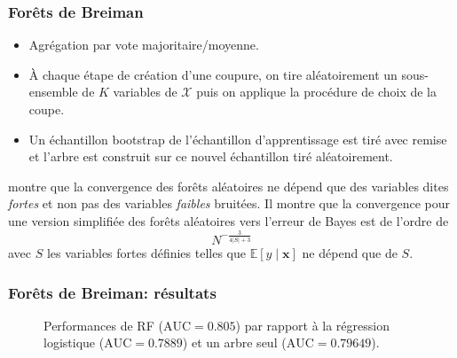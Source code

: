 \documentclass[dvipsnames,10pt]{beamer}
\theoremstyle{plain}
\theoremstyle{definition}
\begin{document}
\begin{frame}
\frametitle{Forêts de Breiman}
\begin{itemize}
    \item Agrégation par vote majoritaire/moyenne.
    \item À chaque étape de création d'une coupure, on tire aléatoirement un sous-ensemble de $K$ variables de $\mathcal{X}$ puis on applique la procédure de choix de la coupe.
    \item Un échantillon bootstrap de l'échantillon d'apprentissage est tiré avec remise et l'arbre est construit sur ce nouvel échantillon tiré aléatoirement.
\end{itemize}

\cite{Breiman2004a} montre que la convergence des forêts aléatoires ne dépend que des variables dites \emph{fortes} et non pas des variables \emph{faibles} bruitées. Il montre que la convergence pour une version simplifiée des forêts aléatoires vers l'erreur de Bayes est de l'ordre de
\begin{equation*}
    N^{- \frac{3}{4 \vert S \vert + 3}}
\end{equation*}
avec $S$ les variables fortes définies telles que $\mathbb{E} \left[ y \mid \mathbf{x} \right]$ ne dépend que de $S$.
\end{frame}

\begin{frame}
\frametitle{Forêts de Breiman: résultats}
\begin{figure}[H]
\centering
    \caption{Performances de RF ($\mathrm{AUC} = 0.805$) par rapport à la régression logistique ($\mathrm{AUC} = 0.7889$) et un arbre seul ($\mathrm{AUC} = 0.79649$).}
\end{figure}
\end{frame}
\end{document}

